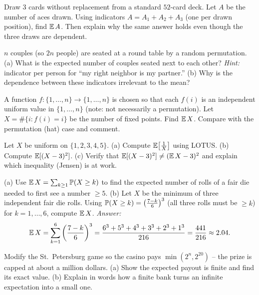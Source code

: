 \begin{exercise}
\label{ch08:exr-linearity}
Draw $3$ cards without replacement from a standard $52$-card deck. Let $A$ be the
number of aces drawn. Using indicators $A = A_1 + A_2 + A_3$ (one per drawn
position), find $\E A$. Then explain why the same answer holds even though the
three draws are dependent.
\end{exercise}

\begin{exercise}
\label{ch08:exr-hats}
$n$ couples (so $2n$ people) are seated at a round table by a random permutation.
(a) What is the expected number of couples seated next to each other?
\emph{Hint:} indicator per person for ``my right neighbor is my partner.''
(b) Why is the dependence between these indicators irrelevant to the mean?
\end{exercise}

\begin{exercise}
\label{ch08:exr-fixedpoints}
A function $f:\{1,\dots,n\}\to\{1,\dots,n\}$ is chosen so that each $f(i)$ is an
independent uniform value in $\{1,\dots,n\}$ (note: not necessarily a
permutation). Let $X = \#\{i : f(i) = i\}$ be the number of fixed points. Find
$\E X$. Compare with the permutation (hat) case and comment.
\end{exercise}

\begin{exercise}
\label{ch08:exr-lotus}
Let $X$ be uniform on $\{1,2,3,4,5\}$.
(a) Compute $\E\!\left[\tfrac{1}{X}\right]$ using LOTUS.
(b) Compute $\E[(X-3)^2]$.
(c) Verify that $\E[(X-3)^2] \ne (\E X - 3)^2$ and explain which inequality
(Jensen) is at work.
\end{exercise}

\begin{exercise}
\label{ch08:exr-tailsum}
(a) Use $\E X = \sum_{k\ge1}\P(X\ge k)$ to find the expected number of rolls of a
fair die needed to first see a number $\ge 5$.
(b) Let $X$ be the minimum of three independent fair die rolls. Using
$\P(X \ge k) = \bigl(\tfrac{7-k}{6}\bigr)^3$ (all three rolls must be $\ge k$) for
$k = 1,\dots,6$, compute $\E X$. \emph{Answer:}
\[
  \E X = \sum_{k=1}^{6}\left(\frac{7-k}{6}\right)^3
       = \frac{6^3+5^3+4^3+3^3+2^3+1^3}{216} = \frac{441}{216} \approx 2.04.
\]
\end{exercise}

\begin{exercise}
\label{ch08:exr-stpete}
Modify the St.\ Petersburg game so the casino pays $\min(2^n, 2^{20})$ -- the prize
is capped at about a million dollars.
(a) Show the expected payout is finite and find its exact value.
(b) Explain in words how a finite bank turns an infinite expectation into a small
one.
\end{exercise}

